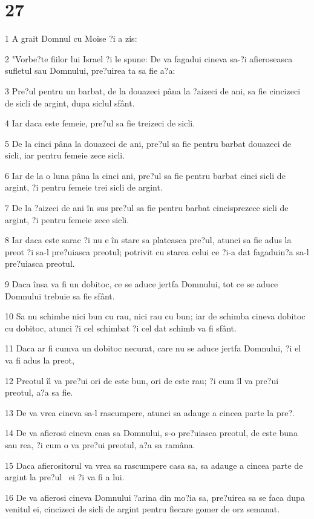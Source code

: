 \chapter{27}

\par 1 A grait Domnul cu Moise ?i a zis:
\par 2 "Vorbe?te fiilor lui Israel ?i le spune: De va fagadui cineva sa-?i afieroseasca sufletul sau Domnului, pre?uirea ta sa fie a?a:
\par 3 Pre?ul pentru un barbat, de la douazeci pâna la ?aizeci de ani, sa fie cincizeci de sicli de argint, dupa siclul sfânt.
\par 4 Iar daca este femeie, pre?ul sa fie treizeci de sicli.
\par 5 De la cinci pâna la douazeci de ani, pre?ul sa fie pentru barbat douazeci de sicli, iar pentru femeie zece sicli.
\par 6 Iar de la o luna pâna la cinci ani, pre?ul sa fie pentru barbat cinci sicli de argint, ?i pentru femeie trei sicli de argint.
\par 7 De la ?aizeci de ani în sus pre?ul sa fie pentru barbat cincisprezece sicli de argint, ?i pentru femeie zece sicli.
\par 8 Iar daca este sarac ?i nu e în stare sa plateasca pre?ul, atunci sa fie adus la preot ?i sa-l pre?uiasca preotul; potrivit cu starea celui ce ?i-a dat fagaduin?a sa-l pre?uiasca preotul.
\par 9 Daca însa va fi un dobitoc, ce se aduce jertfa Domnului, tot ce se aduce Domnului trebuie sa fie sfânt.
\par 10 Sa nu schimbe nici bun cu rau, nici rau cu bun; iar de schimba cineva dobitoc cu dobitoc, atunci ?i cel schimbat ?i cel dat schimb va fi sfânt.
\par 11 Daca ar fi cumva un dobitoc necurat, care nu se aduce jertfa Domnului, ?i el va fi adus la preot,
\par 12 Preotul îl va pre?ui ori de este bun, ori de este rau; ?i cum îl va pre?ui preotul, a?a sa fie.
\par 13 De va vrea cineva sa-l rascumpere, atunci sa adauge a cincea parte la pre?.
\par 14 De va afierosi cineva casa sa Domnului, s-o pre?uiasca preotul, de este buna sau rea, ?i cum o va pre?ui preotul, a?a sa ramâna.
\par 15 Daca afierositorul va vrea sa rascumpere casa sa, sa adauge a cincea parte de argint la pre?ul  ei ?i va fi a lui.
\par 16 De va afierosi cineva Domnului ?arina din mo?ia sa, pre?uirea sa se faca dupa venitul ei, cincizeci de sicli de argint pentru fiecare gomer de orz semanat.
